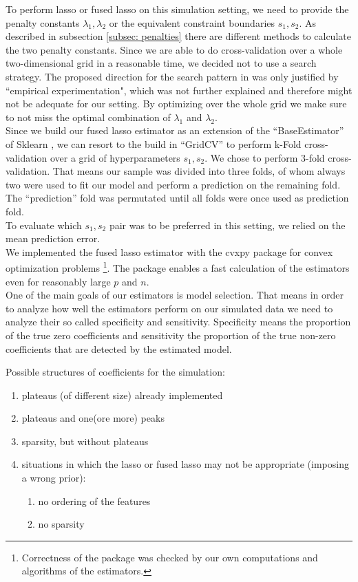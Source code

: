 \documentclass{article}
\theoremstyle{definition}
\begin{document}
To perform lasso or fused lasso on this simulation setting, we need to provide the penalty constants $\lambda_1,\lambda_2$ or the equivalent constraint boundaries $s_1, s_2$. As described in subsection \ref{subsec: penalties} there are different methods to calculate the two penalty constants. Since we are able to do cross-validation over a whole two-dimensional grid in a reasonable time, we decided not to use a search strategy. The proposed direction for the search pattern in \citet{fused} was only justified by “empirical experimentation", which was not further explained and therefore might not be adequate for our setting. By optimizing over the whole grid we make sure to not miss the optimal combination of $\lambda_1$ and $\lambda_2$.\\

Since we build our fused lasso estimator as an extension of the ``BaseEstimator'' of Sklearn \citep{scikit-learn}, we can resort to the build in ``GridCV'' to perform k-Fold cross-validation over a grid of hyperparameters $s_1,s_2$. We chose to perform 3-fold cross-validation. That means our sample was divided into three folds, of whom always two were used to fit our model and perform a prediction on the remaining fold. The ``prediction'' fold was permutated until all folds were once used as prediction fold.\\
To evaluate which $s_1,s_2$ pair was to be preferred in this setting, we relied on the mean prediction error.
\\


We implemented the fused lasso estimator with the cvxpy package for convex optimization problems \citep{cvxpy}\footnote{Correctness of the package was checked by our own computations and algorithms of the estimators.}. The package enables a fast calculation of the estimators even for reasonably large $p$ and $n$. \\

One of the main goals of our estimators is model selection. That means in order to analyze how well the estimators perform on our simulated data we need to analyze their so called specificity and sensitivity. Specificity means the proportion of the true zero coefficients and sensitivity the proportion of the true non-zero coefficients that are detected by the estimated model.



Possible structures of coefficients for the simulation:
\begin{enumerate}
	\item plateaus (of different size) already implemented
	\item plateaus and one(ore more) peaks
	\item sparsity, but without plateaus
	\item situations in which the lasso or fused lasso may not be appropriate (imposing a wrong prior):
	\begin{enumerate}
		\item no ordering of the features
		\item no sparsity
	\end{enumerate}
\end{enumerate}
\end{document}
